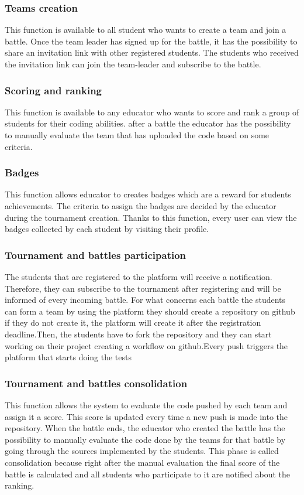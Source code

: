 \subsubsection{Teams creation}
This function is available to all student who wants to create a team and join a battle. Once the team leader has signed up for the battle, it has the possibility to share an invitation link with other registered students. The students who received the invitation link can join the team-leader and subscribe to the battle.

\subsubsection{Scoring and ranking}
This function is available to any educator who wants to score and rank a group of students for their coding abilities. after a battle the educator has the possibility to manually evaluate the team that has uploaded the code based on some criteria.

\subsubsection{Badges}
This function allows educator to creates badges which are a reward for students achievements. The criteria to assign the badges are decided by the educator during the tournament creation.
Thanks to this function, every user can view the badges collected by each student by visiting their profile.

\subsubsection{Tournament and battles participation}
The students that are registered to the platform will receive a notification. Therefore, they can subscribe to the tournament after registering and will be informed of every incoming battle.
For what concerns each battle the students can form a team by using the platform they should create a repository on github if they do not create it, the platform will create it after the registration deadline.Then, the students have to fork the repository and they can start working on their project creating a workflow on github.Every push triggers the platform that starts doing the tests

\subsubsection{Tournament and battles consolidation}
This function allows the system to evaluate the code pushed by each team and assign it a score. This score is updated every time a new push is made into the repository.
When the battle ends, the educator who created the battle has the possibility to manually evaluate the code done by the teams for that battle by going through the sources implemented by the students. This phase is called consolidation because right after the manual evaluation the final score of the battle is calculated and all students who participate to it are notified about the ranking.

